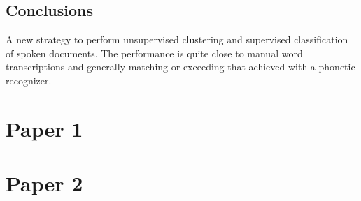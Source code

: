 \documentclass[a4paper]{article}
\begin{document}
\subsection{Conclusions}
A new strategy to perform unsupervised clustering and supervised classification of spoken documents. The performance is quite close to manual word transcriptions and generally matching or exceeding that achieved with a phonetic recognizer.

\section{Paper 1}

\section{Paper 2}





\end{document}

